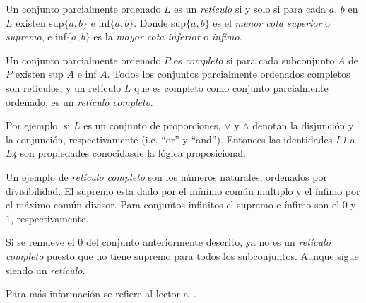 Un conjunto parcialmente ordenado $L$ es un \textit{ret\'iculo} si y solo si para cada $a$, 
$b$ en $L$ existen sup$\{a,b\}$ e inf$\{a,b\}$. Donde sup$\{a,b\}$ es el \textit{menor cota superior} o 
\textit{supremo}, e inf$\{a,b\}$ es la \textit{mayor cota inferior} o \textit{\'infimo}.

Un conjunto parcialmente ordenado $P$ es \textit{completo} si para cada subconjunto $A$ 
de $P$ existen sup $A$ e inf $A$. Todos los conjuntos parcialmente ordenados completos son 
ret\'iculos, y un ret\'iculo $L$ que es completo como conjunto parcialmente ordenado, es un 
\textit{ret\'iculo completo}.

Por ejemplo, si $L$ es un conjunto de proporciones, $\vee$ y $\wedge$ denotan 
la disjunci\'on y la conjunci\'on, respectivamente (i.e. ``or'' y ``and''). Entonces las 
identidades \textit{L1} a \textit{L4} son propiedades conocidasde la l\'ogica proposicional. 

Un ejemplo de \textit{ret\'iculo completo} son los n\'umeros naturales, ordenados por divisibilidad. 
El supremo esta dado por el m\'inimo com\'un multiplo y el \'infimo por el m\'aximo com\'un divisor. Para conjuntos 
infinitos el supremo e \'infimo son el $0$ y $1$, respectivamente. 

Si se remueve el $0$ del conjunto anteriormente descrito, ya no es un \textit{ret\'iculo completo} puesto 
que no tiene supremo para todos los subconjuntos. Aunque sigue siendo un \textit{ret\'iculo}.

Para m\'as informaci\'on se refiere al lector a~\cite{burris1981course}.




